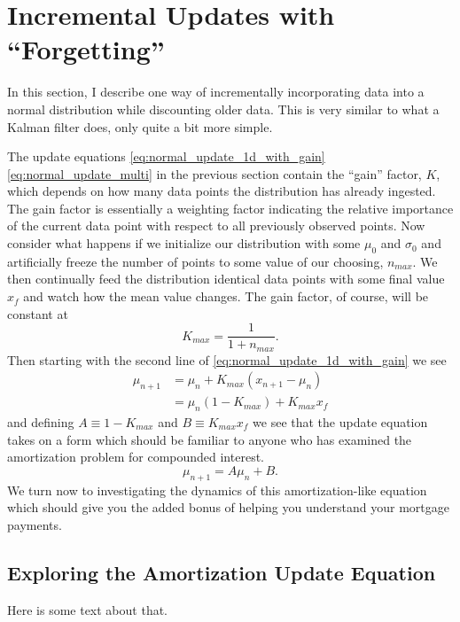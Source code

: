 \documentclass[../../main.tex]{subfiles}
\begin{document}
\section{Incremental Updates with ``Forgetting''}
In this section, I describe one way of incrementally incorporating data into a
normal distribution while discounting older data.  This is very similar to what
a Kalman filter does, only quite a bit more simple.

The update equations \eqref{eq:normal_update_1d_with_gain}
\eqref{eq:normal_update_multi} in the previous section contain the ``gain''
factor, $K$, which depends on how many data points the distribution has already
ingested.  The gain factor is essentially a weighting factor indicating the
relative importance of the current data point with respect to all previously
observed points.  Now consider what happens if we initialize our distribution
with some $\mu_0$ and $\sigma_0$ and artificially freeze the number of points to
some value of our choosing, $n_{max}$.  We then continually feed the
distribution identical data points with some final value $x_f$ and watch how
the mean value changes.  The gain factor, of course, will be constant at
\begin{equation}
    \label{eq:k_const}
    K_{max} = \frac{1}{1 + n_{max}}.
\end{equation}
Then starting with the second line of
\eqref{eq:normal_update_1d_with_gain} we see
\begin{align}
    \label{eq:interest}
    \mu_{n+1} &= \mu_n  + K_{max} \left( x_{n+1} - \mu_n \right)\nonumber\\
              &= \mu_n (1 - K_{max}) + K_{max}x_f
\end{align}
and defining $A \equiv 1-K_{max}$ and $B \equiv K_{max} x_f$
we see that the update equation takes on a form which should be familiar to
anyone who has examined the amortization problem for compounded interest.
\begin{equation}
    \label{eq:interest}
    \mu_{n+1} = A \mu_n + B.
\end{equation}
We turn now to investigating the dynamics of this amortization-like equation
which should give you the added bonus of helping you understand your mortgage
payments.
\subsection{Exploring the Amortization Update Equation}
Here is some text about that.

 
\end{document}
